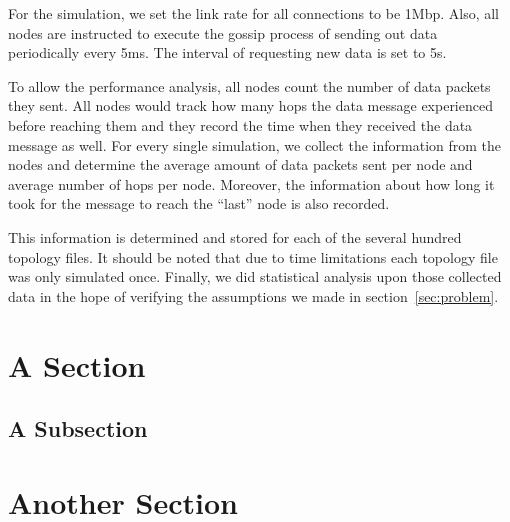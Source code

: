 For the simulation, we set the link rate for all connections to be 1Mbp. Also, all nodes are instructed to execute the gossip process of sending out data periodically every 5ms. The interval of requesting new data is set to 5s.

To allow the performance analysis, all nodes count the number of data packets they sent. All nodes would track how many hops the data message experienced before reaching them and they record the time when they received the data message as well. For every single simulation, we collect the information from the nodes and determine the average amount of data packets sent per node and average number of hops per node. Moreover, the information about how long it took for the message to reach the ``last'' node is also recorded.

This information is determined and stored for each of the several hundred topology files. It should be noted that due to time limitations each topology file was only simulated once. Finally, we did statistical analysis upon those collected data in the hope of verifying the assumptions we made in section~\ref{sec:problem}.


\section{A Section}



\subsection{A Subsection}



\section{Another Section}

